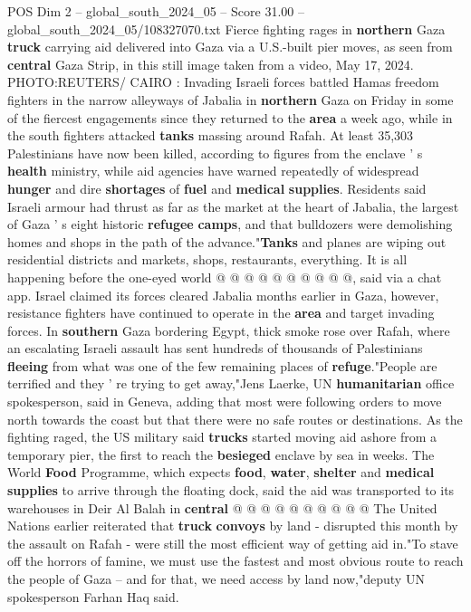 \begin{textsample}{POS Dim 2 – global\_south\_2024\_05 – Score 31.00 – global\_south\_2024\_05/108327070.txt}  \label{ex:f2_pos_074}
Fierce fighting rages in \textbf{northern} Gaza \textbf{truck} carrying aid delivered into Gaza via a U.S.-built pier moves, as seen from \textbf{central} Gaza Strip, in this still image taken from a video, May 17, 2024.
PHOTO:REUTERS/ CAIRO : Invading Israeli forces battled Hamas freedom fighters in the narrow alleyways of Jabalia in \textbf{northern} Gaza on Friday in some of the fiercest engagements since they returned to the \textbf{area} a week ago, while in the south fighters attacked \textbf{tanks} massing around Rafah.
At least 35,303 Palestinians have now been killed, according to figures from the enclave ' s \textbf{health} ministry, while aid agencies have warned repeatedly of widespread \textbf{hunger} and dire \textbf{shortages} of \textbf{fuel} and \textbf{medical} \textbf{supplies}.
Residents said Israeli armour had thrust as far as the market at the heart of Jabalia, the largest of Gaza ' s eight historic \textbf{refugee} \textbf{camps}, and that bulldozers were demolishing homes and shops in the path of the advance."\textbf{Tanks} and planes are wiping out residential districts and markets, shops, restaurants, everything.
It is all happening before the one-eyed world @ @ @ @ @ @ @ @ @ @, said via a chat app.
Israel claimed its forces cleared Jabalia months earlier in Gaza, however, resistance fighters have continued to operate in the \textbf{area} and target invading forces.
In \textbf{southern} Gaza bordering Egypt, thick smoke rose over Rafah, where an escalating Israeli assault has sent hundreds of thousands of Palestinians \textbf{fleeing} from what was one of the few remaining places of \textbf{refuge}."People are terrified and they ' re trying to get away,"Jens Laerke, UN \textbf{humanitarian} office spokesperson, said in Geneva, adding that most were following orders to move north towards the coast but that there were no safe routes or destinations.
As the fighting raged, the US military said \textbf{trucks} started moving aid ashore from a temporary pier, the first to reach the \textbf{besieged} enclave by sea in weeks.
The World \textbf{Food} Programme, which expects \textbf{food}, \textbf{water}, \textbf{shelter} and \textbf{medical} \textbf{supplies} to arrive through the floating dock, said the aid was transported to its warehouses in Deir Al Balah in \textbf{central} @ @ @ @ @ @ @ @ @ @ The United Nations earlier reiterated that \textbf{truck} \textbf{convoys} by land - disrupted this month by the assault on Rafah - were still the most efficient way of getting aid in."To stave off the horrors of famine, we must use the fastest and most obvious route to reach the people of Gaza -- and for that, we need access by land now,"deputy UN spokesperson Farhan Haq said.

\end{textsample}
